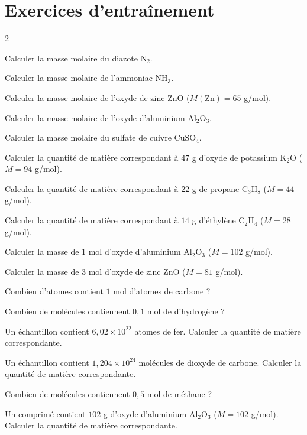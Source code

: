 \section{Exercices d'entraînement}
\begin{multicols}{2}

\exo{} Calculer la masse molaire du diazote $\mathrm{N_2}$.

\exo{} Calculer la masse molaire de l'ammoniac $\mathrm{NH_3}$.

\exo{} Calculer la masse molaire de l'oxyde de zinc $\mathrm{ZnO}$ ($M(\mathrm{Zn})=65$
g/mol).

\exo{} Calculer la masse molaire de l'oxyde d'aluminium $\mathrm{Al_2O_3}$.

\exo{} Calculer la masse molaire du sulfate de cuivre $\mathrm{CuSO_4}$.

\exo{} Calculer la quantité de matière correspondant à $47$ g d'oxyde de
potassium $\mathrm{K_2O}$ ($M=94$ g/mol).

\exo{} Calculer la quantité de matière correspondant à $22$ g de propane
$\mathrm{C_3H_8}$ ($M=44$ g/mol).

\exo{} Calculer la quantité de matière correspondant à $14$ g d'éthylène
$\mathrm{C_2H_4}$ ($M=28$ g/mol).

\exo{} Calculer la masse de $1$ mol d'oxyde d'aluminium $\mathrm{Al_2O_3}$
($M=102$ g/mol).

\exo{} Calculer la masse de $3$ mol d'oxyde de zinc $\mathrm{ZnO}$ ($M=81$
g/mol).

\exo{} Combien d'atomes contient $1$ mol d'atomes de carbone ?

\exo{} Combien de molécules contiennent $0{,}1$ mol de dihydrogène ?

\exo{} Un échantillon contient $6{,}02\times10^{22}$ atomes de fer. Calculer la
quantité de matière correspondante.

\exo{} Un échantillon contient $1{,}204\times10^{24}$ molécules de dioxyde de
carbone. Calculer la quantité de matière correspondante.

\exo{} Combien de molécules contiennent $0{,}5$ mol de méthane ?

\exo{} Un comprimé contient $102$ g d'oxyde d'aluminium $\mathrm{Al_2O_3}$
($M=102$ g/mol). Calculer la quantité de matière correspondante.


\end{multicols}

